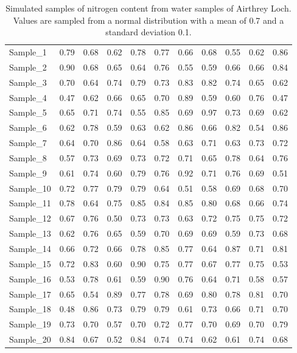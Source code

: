 \documentclass[
]{scrbook}
\begin{document}
\begin{longtable}[]{@{}lrrrrrrrrrr@{}}
\caption{\label{tab:unnamed-chunk-44}Simulated samples of nitrogen content from water samples of Airthrey Loch. Values are sampled from a normal distribution with a mean of 0.7 and a standard deviation 0.1.}\tabularnewline
\toprule
\endhead
Sample\_1 & 0.79 & 0.68 & 0.62 & 0.78 & 0.77 & 0.66 & 0.68 & 0.55 & 0.62 & 0.86 \\
Sample\_2 & 0.90 & 0.68 & 0.65 & 0.64 & 0.76 & 0.55 & 0.59 & 0.66 & 0.66 & 0.84 \\
Sample\_3 & 0.70 & 0.64 & 0.74 & 0.79 & 0.73 & 0.83 & 0.82 & 0.74 & 0.65 & 0.62 \\
Sample\_4 & 0.47 & 0.62 & 0.66 & 0.65 & 0.70 & 0.89 & 0.59 & 0.60 & 0.76 & 0.47 \\
Sample\_5 & 0.65 & 0.71 & 0.74 & 0.55 & 0.85 & 0.69 & 0.97 & 0.73 & 0.69 & 0.62 \\
Sample\_6 & 0.62 & 0.78 & 0.59 & 0.63 & 0.62 & 0.86 & 0.66 & 0.82 & 0.54 & 0.86 \\
Sample\_7 & 0.64 & 0.70 & 0.86 & 0.64 & 0.58 & 0.63 & 0.71 & 0.63 & 0.73 & 0.72 \\
Sample\_8 & 0.57 & 0.73 & 0.69 & 0.73 & 0.72 & 0.71 & 0.65 & 0.78 & 0.64 & 0.76 \\
Sample\_9 & 0.61 & 0.74 & 0.60 & 0.79 & 0.76 & 0.92 & 0.71 & 0.76 & 0.69 & 0.51 \\
Sample\_10 & 0.72 & 0.77 & 0.79 & 0.79 & 0.64 & 0.51 & 0.58 & 0.69 & 0.68 & 0.70 \\
Sample\_11 & 0.78 & 0.64 & 0.75 & 0.85 & 0.84 & 0.85 & 0.80 & 0.68 & 0.66 & 0.74 \\
Sample\_12 & 0.67 & 0.76 & 0.50 & 0.73 & 0.73 & 0.63 & 0.72 & 0.75 & 0.75 & 0.72 \\
Sample\_13 & 0.62 & 0.76 & 0.65 & 0.59 & 0.70 & 0.69 & 0.69 & 0.59 & 0.73 & 0.68 \\
Sample\_14 & 0.66 & 0.72 & 0.66 & 0.78 & 0.85 & 0.77 & 0.64 & 0.87 & 0.71 & 0.81 \\
Sample\_15 & 0.72 & 0.83 & 0.60 & 0.90 & 0.75 & 0.77 & 0.67 & 0.77 & 0.75 & 0.53 \\
Sample\_16 & 0.53 & 0.78 & 0.61 & 0.59 & 0.90 & 0.76 & 0.64 & 0.71 & 0.58 & 0.57 \\
Sample\_17 & 0.65 & 0.54 & 0.89 & 0.77 & 0.78 & 0.69 & 0.80 & 0.78 & 0.81 & 0.70 \\
Sample\_18 & 0.48 & 0.86 & 0.73 & 0.79 & 0.79 & 0.61 & 0.73 & 0.66 & 0.71 & 0.70 \\
Sample\_19 & 0.73 & 0.70 & 0.57 & 0.70 & 0.72 & 0.77 & 0.70 & 0.69 & 0.70 & 0.79 \\
Sample\_20 & 0.84 & 0.67 & 0.52 & 0.84 & 0.74 & 0.74 & 0.62 & 0.61 & 0.74 & 0.68 \\
\bottomrule
\end{longtable}
\end{document}
